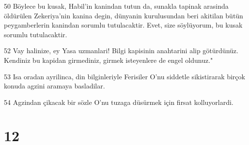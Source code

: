 \par 50 Böylece bu kusak, Habil'in kanindan tutun da, sunakla tapinak arasinda öldürülen Zekeriya'nin kanina degin, dünyanin kurulusundan beri akitilan bütün peygamberlerin kanindan sorumlu tutulacaktir. Evet, size söylüyorum, bu kusak sorumlu tutulacaktir.
\par 52 Vay halinize, ey Yasa uzmanlari! Bilgi kapisinin anahtarini alip götürdünüz. Kendiniz bu kapidan girmediniz, girmek isteyenlere de engel oldunuz."
\par 53 Isa oradan ayrilinca, din bilginleriyle Ferisiler O'nu siddetle sikistirarak birçok konuda agzini aramaya basladilar.
\par 54 Agzindan çikacak bir sözle O'nu tuzaga düsürmek için firsat kolluyorlardi.

\chapter{12}

